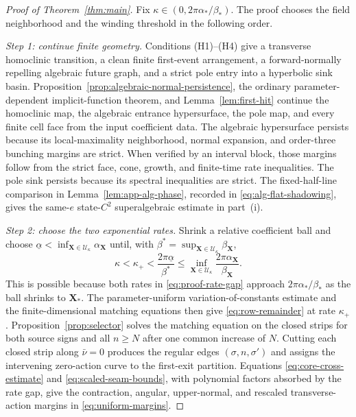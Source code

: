 \documentclass[11pt]{amsart}
\numberwithin{equation}{section}
\theoremstyle{definition}
\theoremstyle{remark}
\newcommand{\cU}{\mathcal U}
\begin{document}
\begin{proof}[Proof of Theorem~\ref{thm:main}]
Fix $\kappa\in(0,2\pi\alpha_*/\beta_*)$.  The proof chooses the field
neighborhood and the winding threshold in the following order.

\emph{Step 1: continue finite geometry.}
Conditions \textup{(H1)}--\textup{(H4)} give a transverse homoclinic
transition, a clean finite first-event arrangement, a forward-normally
repelling algebraic future graph, and a strict pole entry into a hyperbolic
sink basin.  Proposition~\ref{prop:algebraic-normal-persistence}, the
ordinary parameter-dependent implicit-function theorem, and
Lemma~\ref{lem:first-hit} continue the homoclinic map, the algebraic
entrance hypersurface, the pole map, and every finite cell face from the
input coefficient data.  The algebraic hypersurface persists because its
local-maximality neighborhood, normal expansion, and order-three bunching
margins are strict.  When verified by an interval block, those margins
follow from the strict face, cone, growth, and finite-time rate
inequalities.  The pole sink persists because its spectral inequalities
are strict.
The fixed-half-line comparison in
Lemma~\ref{lem:app-alg-phase}, recorded in
\eqref{eq:alg-flat-shadowing}, gives the same-$e$ state-$C^2$
superalgebraic estimate in part~\textup{(i)}.

\emph{Step 2: choose the two exponential rates.}
Shrink a relative coefficient ball and choose
$\underline\alpha<\inf_{\mathbf X\in\cU_\kappa}\alpha_{\mathbf X}$ until, with
$\beta^*=\sup_{\mathbf X\in\cU_\kappa}\beta_{\mathbf X}$,
\begin{equation}\label{eq:proof-rate-gap}
 \kappa<\kappa_+<\frac{2\pi\underline\alpha}{\beta^*}
 \le \inf_{\mathbf X\in\cU_\kappa}
 \frac{2\pi\alpha_{\mathbf X}}{\beta_{\mathbf X}}.
\end{equation}
This is possible because both rates in \eqref{eq:proof-rate-gap} approach
$2\pi\alpha_*/\beta_*$ as the ball shrinks to $\mathbf X_*$.  The
parameter-uniform variation-of-constants estimate and the
finite-dimensional matching equations then give
\eqref{eq:row-remainder} at rate $\kappa_+$.  Proposition~\ref{prop:selector}
solves the matching equation on the closed strips for both source signs
and all $n\ge N$ after one common increase of $N$.  Cutting each closed
strip along $\bar\nu=0$ produces
the regular edges $(\sigma,n,\sigma')$ and assigns the intervening
zero-action curve to the first-exit partition.
Equations \eqref{eq:core-cross-estimate} and
\eqref{eq:scaled-seam-bounds}, with polynomial factors absorbed by the rate gap,
give the contraction, angular, upper-normal, and rescaled transverse-action
margins in
\eqref{eq:uniform-margins}.


\end{proof}
\end{document}
